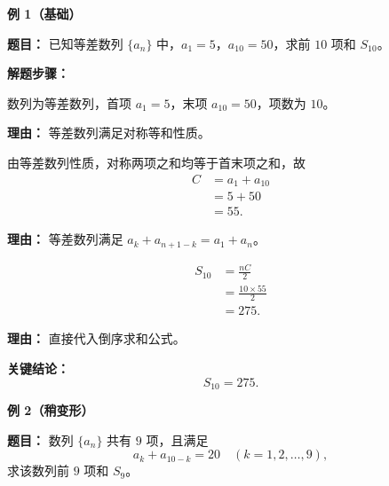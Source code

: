\begin{examplebox}
	\textbf{\textcolor{CExample}{例 1（基础）}}

	\textbf{\textcolor{CExample}{题目：}}
	已知等差数列 \(\{a_n\}\) 中，\(a_1=5\)，\(a_{10}=50\)，求前 \(10\) 项和 \(S_{10}\)。

	\textbf{\textcolor{CExample}{解题步骤：}}
	\begin{description}[style=nextline, leftmargin=2.8em, labelsep=0.5em, itemsep=0.45em]
		\item[\textbf{第一步（识别等差）：}]
		      数列为等差数列，首项 \(a_1=5\)，末项 \(a_{10}=50\)，项数为 \(10\)。
		      \par\textbf{理由：} 等差数列满足对称等和性质。
		\item[\textbf{第二步（确定常数）：}]
		      由等差数列性质，对称两项之和均等于首末项之和，故
		      \[
			      \begin{aligned}
				      C & =a_1+a_{10} \\
				        & =5+50       \\
				        & =55.
			      \end{aligned}
		      \]
		      \par\textbf{理由：} 等差数列满足 \(a_k+a_{n+1-k}=a_1+a_n\)。
		\item[\textbf{第三步（套用公式）：}]
		      \[
			      \begin{aligned}
				      S_{10}
				       & =\frac{nC}{2}         \\
				       & =\frac{10\times55}{2} \\
				       & =275.
			      \end{aligned}
		      \]
		      \par\textbf{理由：} 直接代入倒序求和公式。
	\end{description}

	\textbf{\textcolor{CExample}{关键结论：}}
	\[
		\boxed{S_{10}=275}.
	\]

	\medskip
	\textbf{\textcolor{CExample}{例 2（稍变形）}}

	\textbf{\textcolor{CExample}{题目：}}
	数列 \(\{a_n\}\) 共有 \(9\) 项，且满足
	\[
		a_k+a_{10-k}=20\quad(k=1,2,\dots,9),
	\]
	求该数列前 \(9\) 项和 \(S_9\)。


\end{examplebox}
